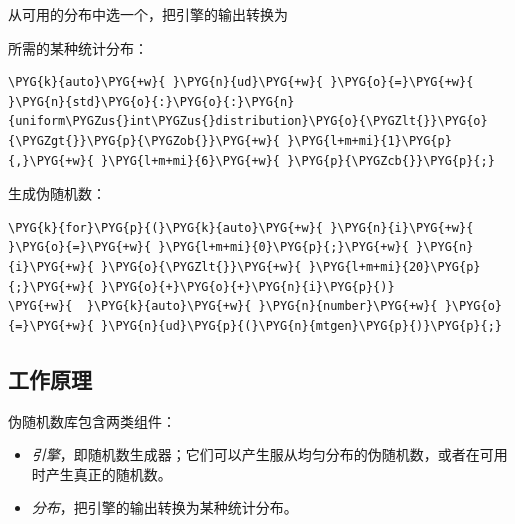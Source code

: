 
从可用的分布中选一个，把引擎的输出转换为



所需的某种统计分布：



\begin{codeblockbg}
\begin{Verbatim}[commandchars=\\\{\},breaklines=true,breakanywhere=true,fontsize=\codefont,xleftmargin=17bp]
\PYG{k}{auto}\PYG{+w}{ }\PYG{n}{ud}\PYG{+w}{ }\PYG{o}{=}\PYG{+w}{ }\PYG{n}{std}\PYG{o}{:}\PYG{o}{:}\PYG{n}{uniform\PYGZus{}int\PYGZus{}distribution}\PYG{o}{\PYGZlt{}}\PYG{o}{\PYGZgt{}}\PYG{p}{\PYGZob{}}\PYG{+w}{ }\PYG{l+m+mi}{1}\PYG{p}{,}\PYG{+w}{ }\PYG{l+m+mi}{6}\PYG{+w}{ }\PYG{p}{\PYGZcb{}}\PYG{p}{;}
\end{Verbatim}
\end{codeblockbg}



生成伪随机数：



\begin{codeblockbg}
\begin{Verbatim}[commandchars=\\\{\},breaklines=true,breakanywhere=true,fontsize=\codefont,xleftmargin=17bp]
\PYG{k}{for}\PYG{p}{(}\PYG{k}{auto}\PYG{+w}{ }\PYG{n}{i}\PYG{+w}{ }\PYG{o}{=}\PYG{+w}{ }\PYG{l+m+mi}{0}\PYG{p}{;}\PYG{+w}{ }\PYG{n}{i}\PYG{+w}{ }\PYG{o}{\PYGZlt{}}\PYG{+w}{ }\PYG{l+m+mi}{20}\PYG{p}{;}\PYG{+w}{ }\PYG{o}{+}\PYG{o}{+}\PYG{n}{i}\PYG{p}{)}
\PYG{+w}{  }\PYG{k}{auto}\PYG{+w}{ }\PYG{n}{number}\PYG{+w}{ }\PYG{o}{=}\PYG{+w}{ }\PYG{n}{ud}\PYG{p}{(}\PYG{n}{mtgen}\PYG{p}{)}\PYG{p}{;}
\end{Verbatim}
\end{codeblockbg}



\subsection{工作原理}



伪随机数库包含两类组件：



\begin{itemize}
\item \textit{引擎}，即随机数生成器；它们可以产生服从均匀分布的伪随机数，或者在可用时产生真正的随机数。



\item \textit{分布}，把引擎的输出转换为某种统计分布。

\end{itemize}


